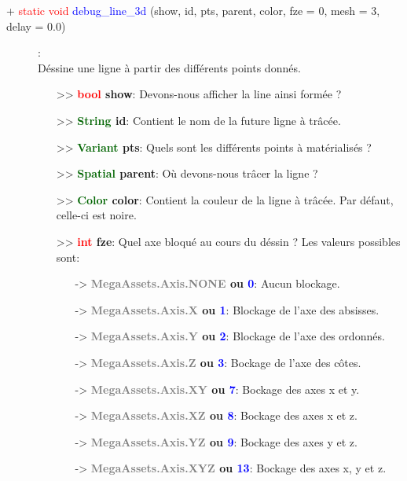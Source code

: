 \documentclass[a4paper, 11pt]{article}
\begin{document}
	\begin{description}
		\item [+ \textcolor{red}{static void} \textcolor{blue}{debug\_line\_3d} (show, id, pts, parent,
		color, fze = 0, mesh = 3, delay = 0.0)]: \\Déssine une ligne à partir des différents points donnés.
		\begin{itemize}
			\item[>> \textbf{\textcolor{red}{bool} show}:] Devons-nous afficher la line ainsi formée ?
			\item[>> \textbf{\textcolor{darkgreen}{String} id}:] Contient le nom de la future ligne à
			trâcée.
			\item[>> \textbf{\textcolor{darkgreen}{Variant} pts}:] Quels sont les différents points à 
			matérialisés ?
			\item[>> \textbf{\textcolor{darkgreen}{Spatial} parent}:] Où devons-nous trâcer la ligne ?
			\item[>> \textbf{\textcolor{darkgreen}{Color} color}:] Contient la couleur de la ligne à trâcée.
			Par défaut, celle-ci est noire.
			\item[>> \textbf{\textcolor{red}{int} fze}:] Quel axe bloqué au cours du déssin ? Les valeurs 
			possibles sont:
			\begin{itemize}
				\item [-> \textbf{\textcolor{gray}{MegaAssets.Axis.NONE} ou \textcolor{blue}{0}}:] Aucun 
				blockage.
				\item [-> \textbf{\textcolor{gray}{MegaAssets.Axis.X} ou \textcolor{blue}{1}}:] Blockage de
				l'axe des absisses.
				\item [-> \textbf{\textcolor{gray}{MegaAssets.Axis.Y} ou \textcolor{blue}{2}}:] Blockage de
				l'axe des ordonnés.
				\item [-> \textbf{\textcolor{gray}{MegaAssets.Axis.Z} ou \textcolor{blue}{3}}:] Bockage de
				l'axe des côtes.
				\item [-> \textbf{\textcolor{gray}{MegaAssets.Axis.XY} ou \textcolor{blue}{7}}:] Bockage des
				axes x et y.
				\item [-> \textbf{\textcolor{gray}{MegaAssets.Axis.XZ} ou \textcolor{blue}{8}}:] Bockage des
				axes x et z.
				\item [-> \textbf{\textcolor{gray}{MegaAssets.Axis.YZ} ou \textcolor{blue}{9}}:] Bockage des
				axes y et z.
				\item [-> \textbf{\textcolor{gray}{MegaAssets.Axis.XYZ} ou \textcolor{blue}{13}}:] Bockage
				des axes x, y et z.
			\end{itemize}

\end{itemize}
\end{description}
\end{document}
